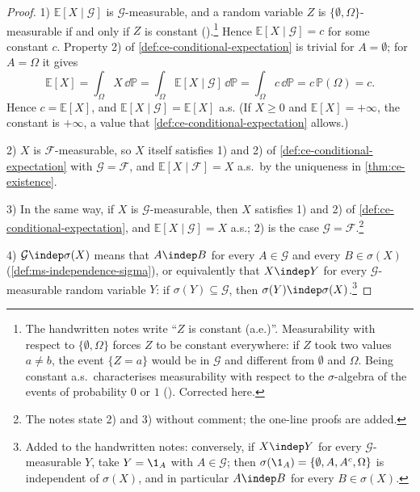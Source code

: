 \begin{proof}
1) $\mathbb E[X\mid\mathcal G]$ is $\mathcal G$-measurable, and a random variable $Z$ is
$\{\emptyset,\Omega\}$-measurable if and only if $Z$ is constant ().\footnote{The
handwritten notes write ``$Z$ is constant (a.e.)''. Measurability with respect to
$\{\emptyset,\Omega\}$ forces $Z$ to be constant everywhere: if $Z$ took two values $a\ne b$, the
event $\{Z=a\}$ would be in $\mathcal G$ and different from $\emptyset$ and $\Omega$. Being
constant a.s.\ characterises measurability with respect to the $\sigma$-algebra of the events of
probability $0$ or $1$ (). Corrected here.} Hence
$\mathbb E[X\mid\mathcal G]=c$ for some constant $c$. Property 2) of
\cref{def:ce-conditional-expectation} is trivial for $A=\emptyset$; for $A=\Omega$ it gives
\[
  \mathbb E[X]=\int_\Omega X\,\dd\mathbb P=\int_\Omega\mathbb E[X\mid\mathcal G]\,\dd\mathbb P
  =\int_\Omega c\,\dd\mathbb P=c\,\mathbb P(\Omega)=c .
\]
Hence $c=\mathbb E[X]$, and $\mathbb E[X\mid\mathcal G]=\mathbb E[X]$ a.s. (If $X\ge0$ and
$\mathbb E[X]=+\infty$, the constant is $+\infty$, a value that
\cref{def:ce-conditional-expectation} allows.)

2) $X$ is $\mathcal F$-measurable, so $X$ itself satisfies 1) and 2) of
\cref{def:ce-conditional-expectation} with $\mathcal G=\mathcal F$, and
$\mathbb E[X\mid\mathcal F]=X$ a.s.\ by the uniqueness in \cref{thm:ce-existence}.

3) In the same way, if $X$ is $\mathcal G$-measurable, then $X$ satisfies 1) and 2) of
\cref{def:ce-conditional-expectation}, and $\mathbb E[X\mid\mathcal G]=X$ a.s.; 2) is the case
$\mathcal G=\mathcal F$.\footnote{The notes state 2) and 3) without comment; the one-line proofs
are added.}

4) $\mathcal G\indep\sigma(X)$ means that $A\indep B$ for every $A\in\mathcal G$ and every
$B\in\sigma(X)$ (\cref{def:ms-independence-sigma}), or equivalently that $X\indep Y$ for every
$\mathcal G$-measurable random variable $Y$: if $\sigma(Y)\subseteq\mathcal G$, then
$\sigma(Y)\indep\sigma(X)$.\footnote{Added to the handwritten notes: conversely, if $X\indep Y$ for
every $\mathcal G$-measurable $Y$, take $Y=\1_A$ with $A\in\mathcal G$; then
$\sigma(\1_A)=\{\emptyset,A,A^c,\Omega\}$ is independent of $\sigma(X)$, and in particular
$A\indep B$ for every $B\in\sigma(X)$.}


\end{proof}
